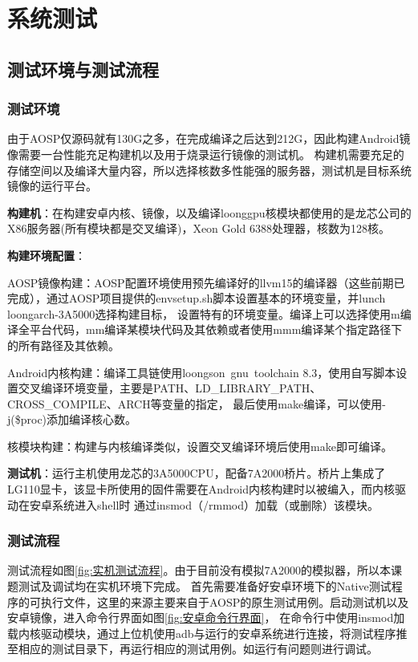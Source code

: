 
\chapter{系统测试}

\section{测试环境与测试流程}

\subsection{测试环境}
由于AOSP仅源码就有130G之多，在完成编译之后达到212G，因此构建Android镜像需要一台性能充足构建机以及用于烧录运行镜像的测试机。
构建机需要充足的存储空间以及编译大量内容，所以选择核数多性能强的服务器，测试机是目标系统镜像的运行平台。

\textbf{构建机}：在构建安卓内核、镜像，以及编译loonggpu核模块都使用的是龙芯公司的X86服务器(所有模块都是交叉编译)，Xeon Gold 6388处理器，核数为128核。

\textbf{构建环境配置}：

    AOSP镜像构建：AOSP配置环境使用预先编译好的llvm15的编译器（这些前期已完成），通过AOSP项目提供的envsetup.sh脚本设置基本的环境变量，并lunch loongarch-3A5000选择构建目标，
        设置特有的环境变量。编译上可以选择使用m编译全平台代码，mm编译某模块代码及其依赖或者使用mmm编译某个指定路径下的所有路径及其依赖\cite{罗升阳2016android}。

    Android内核构建：编译工具链使用loongson\ gnu\ toolchain 8.3，使用自写脚本设置交叉编译环境变量，主要是PATH、LD\_LIBRARY\_PATH、CROSS\_COMPILE、ARCH等变量的指定，
        最后使用make编译，可以使用-j(\$proc)添加编译核心数。

    核模块构建：构建与内核编译类似，设置交叉编译环境后使用make即可编译。

\textbf{测试机}：运行主机使用龙芯的3A5000CPU，配备7A2000桥片。桥片上集成了LG110显卡，该显卡所使用的固件需要在Android内核构建时以被编入，而内核驱动在安卓系统进入shell时
    通过insmod（/rmmod）加载（或删除）该模块。

\subsection{测试流程}
测试流程如图\ref{fig:实机测试流程}。由于目前没有模拟7A2000的模拟器，所以本课题测试及调试均在实机环境下完成。
首先需要准备好安卓环境下的Native测试程序的可执行文件，这里的来源主要来自于AOSP的原生测试用例。启动测试机以及安卓镜像，进入命令行界面如图\ref{fig:安卓命令行界面}，
在命令行中使用insmod加载内核驱动模块，通过上位机使用adb与运行的安卓系统进行连接，将测试程序推至相应的测试目录下，再运行相应的测试用例。如运行有问题则进行调试。

